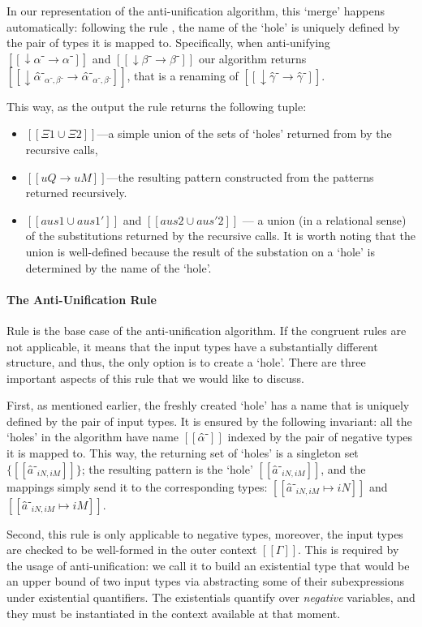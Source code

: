   In our representation of the anti-unification algorithm, this `merge' happens
  automatically:
  following the rule ,
  the name of the `hole' is uniquely defined by the pair of types it is mapped to.  
  Specifically, when anti-unifying $[[↓α⁻ → α⁻]]$ and $[[↓β⁻ → β⁻]]$ our algorithm returns 
  $[[↓α̂⁻_{α⁻, β⁻} → α̂⁻_{α⁻, β⁻}]]$, that is a renaming of $[[↓γ̂⁻ → γ̂⁻]]$.

  This way, as the output the rule returns the following tuple:
  \begin{itemize}
    \item $[[Ξ1 ∪ Ξ2]]$---a simple union of the sets of `holes' 
      returned from by the recursive calls, 
    \item $[[uQ → uM]]$---the resulting pattern 
      constructed from the patterns returned recursively.
    \item $[[aus1 ∪ aus1']]$ and $[[aus2 ∪ aus'2]]$
      --- a union (in a relational sense)
      of the substitutions returned by the recursive calls. 
      It is worth noting that the union is well-defined because
      the result of the substation on a `hole' is determined by the 
      name of the `hole'.
  \end{itemize}

\paragraph{The Anti-Unification Rule}
  Rule  is the base case of the anti-unification
  algorithm. If the congruent rules are not applicable, 
  it means that the input types have a substantially different structure,
  and thus, the only option is to create a `hole'. 
  There are three important aspects of this rule that we would like to discuss.

  First, as mentioned earlier, the freshly created `hole' has a name
  that is uniquely defined by the pair of input types.
  It is ensured by the following invariant:
  all the `holes' in the algorithm have name $[[α̂⁻]]$ 
  indexed by the pair of negative types it is mapped to.
  This way, the returning set of `holes' is a singleton set
  $\{ [[ â⁻_{iN, iM} ]]\}$; the resulting 
  pattern is the `hole' $[[â⁻_{iN, iM}]]$,
  and the mappings simply send it to the corresponding types:
  $[[â⁻_{iN, iM} ↦ iN]]$ and $[[â⁻_{iN, iM} ↦ iM]]$.

  Second, this rule is only applicable to negative types, 
  moreover, the input types are checked to be well-formed 
  in the outer context $[[Γ]]$. This is required by the 
  usage of anti-unification: we 
  call it to build an existential type that would be 
  an upper bound of two input types via abstracting
  some of their subexpressions under existential quantifiers.
  The existentials quantify over \emph{negative} variables,
  and they must be instantiated in the context
  available at that moment.

